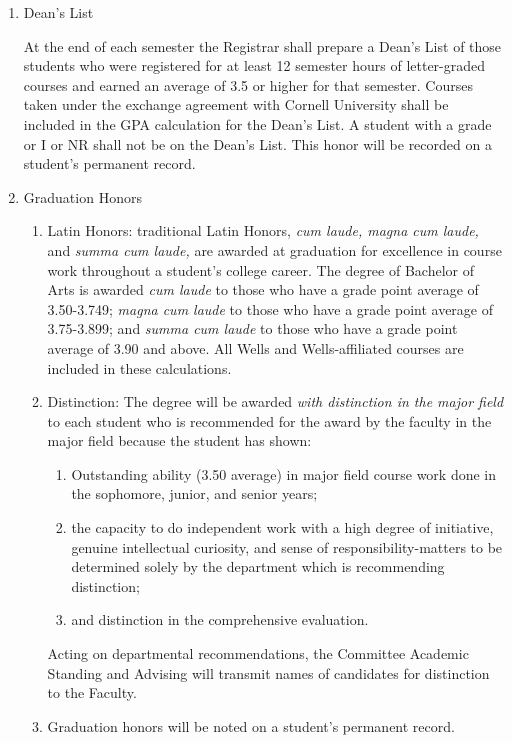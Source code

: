 \documentclass{manual}
\newcommand{\modified}[1]{}
\newcommand{\oldbreak}[1]{}
\newcommand{\itemLevelA}{\alph*.}
\newcommand{\itemLevelB}{\arabic*)}
\newcommand{\itemRefA}{\alph*}
\newcommand{\itemRefB}{\arabic*}
\begin{document}
\begin{enumerate}[label=\itemLevelA,ref=\itemRefA]

\item Dean's List

At the end of each semester the Registrar shall prepare a Dean's List of those students who were registered for at least 12 semester hours of letter-graded courses and earned an average of 3.5 or higher for that semester. Courses taken under the exchange agreement with Cornell University shall be included in the GPA calculation for the Dean's List. A student with a grade or I or NR shall not be on the Dean's List. This honor will be recorded on a student's permanent record.

\item Graduation Honors  \modified{5/13/97}

\begin{enumerate}[label=\itemLevelB,ref=\itemRefB]

\item Latin Honors: traditional Latin Honors, \textit{cum laude, magna cum laude, }and \textit{summa cum laude, }are awarded at graduation for excellence in course work throughout a student's college career. The degree of Bachelor of Arts is awarded \textit{cum laude }to those who have a grade point average of 3.50-3.749; \textit{magna cum laude }to those who have a grade point average of 3.75-3.899; and \textit{summa cum laude }to those who have a grade point average of 3.90 and above. All Wells and Wells-affiliated courses are included in these calculations.



\oldbreak{VII-1}

\item Distinction: The degree will be awarded \textit{with distinction in the major field }to each student who is recommended for the award by the faculty in the major field because the student has shown:

\begin{enumerate}[label=\alph*)]

\item Outstanding ability (3.50 average) in major field course work done in the sophomore, junior, and senior years;

\item the capacity to do independent work with a high degree of initiative, genuine intellectual curiosity, and sense of responsibility-matters to be determined solely by the department which is recommending distinction;

\item and distinction in the comprehensive evaluation.
\end{enumerate}

Acting on departmental recommendations, the Committee Academic Standing and Advising will transmit names of candidates for distinction to the Faculty.

\item Graduation honors will be noted on a student's permanent record.
\end{enumerate}

\end{enumerate}
\end{document}
